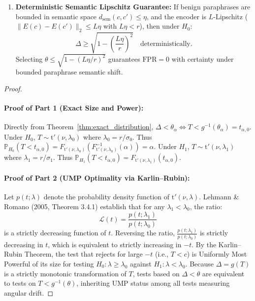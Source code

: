 \begin{theorem}
\begin{enumerate}
    \item \textbf{Deterministic Semantic Lipschitz Guarantee:} If benign paraphrases are bounded in semantic space $d_{\text{sem}}(c, c') \le \eta$, and the encoder is $L$-Lipschitz ($\|E(c) - E(c')\|_2 \le L \eta$ with $L\eta < r$), then under $H_0$:
    \begin{equation}
    \label{eq:lipschitz_bound}
    \Delta \ge \sqrt{1 - \left( \frac{L\eta}{r} \right)^2} \quad \text{deterministically.}
    \end{equation}
    Selecting $\theta \le \sqrt{1 - (L\eta/r)^2}$ guarantees $\mathrm{FPR} = 0$ with certainty under bounded paraphrase semantic shift.
\end{enumerate}
\end{theorem}

\begin{proof}
\paragraph{Proof of Part 1 (Exact Size and Power):}
Directly from Theorem~\ref{thm:exact_distribution}, $\Delta < \theta_\alpha \iff T < g^{-1}(\theta_\alpha) = t_{\alpha, 0}$.
Under $H_0$, $T \sim \mathrm{t}'(\nu, \lambda_0)$ where $\lambda_0 = r/\sigma_0$.
Thus $\mathbb{P}_{H_0}(T < t_{\alpha, 0}) = F_{\mathrm{t}'(\nu, \lambda_0)}(F_{\mathrm{t}'(\nu, \lambda_0)}^{-1}(\alpha)) = \alpha$.
Under $H_1$, $T \sim \mathrm{t}'(\nu, \lambda_1)$ where $\lambda_1 = r/\sigma_1$.
Thus $\mathbb{P}_{H_1}(T < t_{\alpha, 0}) = F_{\mathrm{t}'(\nu, \lambda_1)}(t_{\alpha, 0})$.

\paragraph{Proof of Part 2 (UMP Optimality via Karlin--Rubin):}
Let $p(t; \lambda)$ denote the probability density function of $\mathrm{t}'(\nu, \lambda)$. Lehmann \& Romano (2005, Theorem 3.4.1) establish that for any $\lambda_1 < \lambda_0$, the ratio:
\begin{equation}
\mathcal{L}(t) = \frac{p(t; \lambda_1)}{p(t; \lambda_0)}
\end{equation}
is a strictly decreasing function of $t$. Reversing the ratio, $\frac{p(t; \lambda_1)}{p(t; \lambda_0)}$ is strictly decreasing in $t$, which is equivalent to strictly increasing in $-t$. 
By the Karlin--Rubin Theorem, the test that rejects for large $-t$ (i.e., $T < c$) is Uniformly Most Powerful of its size for testing $H_0: \lambda \ge \lambda_0$ against $H_1: \lambda < \lambda_0$.
Because $\Delta = g(T)$ is a strictly monotonic transformation of $T$, tests based on $\Delta < \theta$ are equivalent to tests on $T < g^{-1}(\theta)$, inheriting UMP status among all tests measuring angular drift.


\end{proof}
